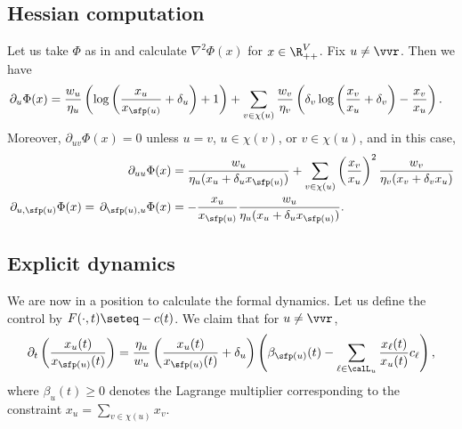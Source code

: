 \subsection{Hessian computation}

Let us take $\Phi$ as in 
and calculate $\nabla^2 \Phi(x)$ for $x \in \R_{++}^{V}$.
Fix $u \neq \vvr$. 
Then we have
\begin{align}
\, \partial_u\Phi(x) &= 
\frac{w_u}{\eta_u}
\left(\log\left(\frac{x_u}{x_{\sfp(u)}}+\delta_u\right) +1\right)
+ \sum_{v \in \chi(u)}\frac{w_v}{\eta_v}\left(\delta_v\log\left(\frac{x_v}{x_u}+\delta_v\right) - \frac{x_v}{x_u}\right). \label{eq:grad-phi}
\end{align}
Moreover, $\partial_{uv} \Phi(x) = 0$ unless $u=v$, $u \in \chi(v)$, or $v \in \chi(u)$, and in this case,
\begin{align*}
\, \partial_{uu}\Phi(x) &= \frac{w_u}{\eta_u(x_u+\delta_u x_{\sfp(u)})} + \sum_{v\in \chi(u)} \left(\frac{x_v}{x_u}\right)^2\frac{w_v}{\eta_v(x_v+\delta_v x_u)} \\
\, \partial_{u,\sfp(u)}\Phi(x) = \, \partial_{\sfp(u),u}\Phi(x) &= -\frac{x_u}{x_{\sfp(u)}}\frac{w_u}{\eta_u(x_u+\delta_u x_{\sfp(u)})}.
\end{align*}

\subsection{Explicit dynamics}

We are now in a position to calculate the formal dynamics.
Let us define the control by $F(\cdot,t) \seteq -c(t)$.
We claim that for $u \neq \vvr$,
\begin{equation}\label{eq:dyn2}
\partial_t \left(\frac{x_u(t)}{x_{\sfp(u)}(t)}\right) =  \frac{\eta_u}{w_u} \left(\frac{x_u(t)}{x_{\sfp(u)}(t)}+\delta_u\right)
\left(\beta_{\sfp(u)}(t)- \sum_{\ell \in \calL_u} \frac{x_{\ell}(t)}{x_{u}(t)} c_{\ell}\right),
\end{equation}
where $\beta_u(t)\ge 0$ denotes the Lagrange multiplier corresponding to the constraint $x_u = \sum_{v\in \chi(u)} x_v$.

